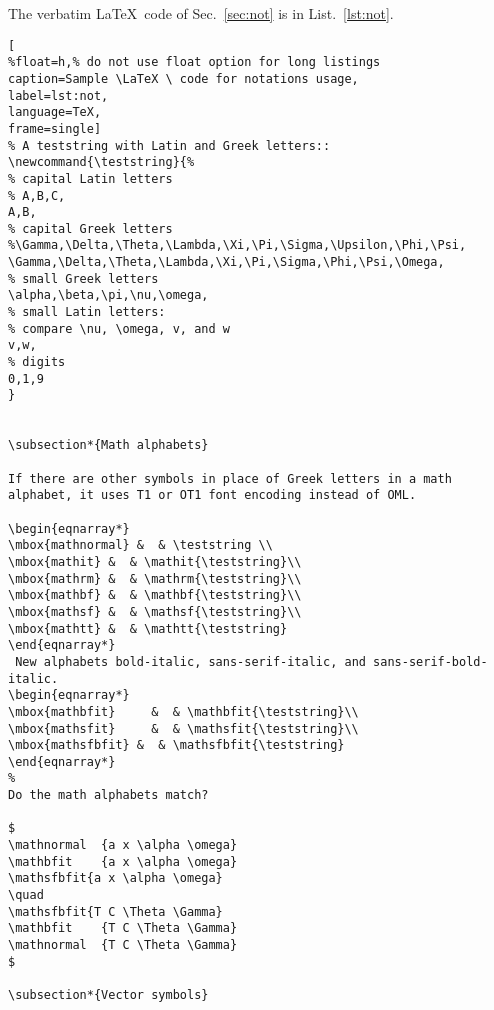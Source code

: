 \newpage
The verbatim \LaTeX \ code of Sec.~\ref{sec:not} is in List.~\ref{lst:not}.

\begin{lstlisting}[
%float=h,% do not use float option for long listings
caption=Sample \LaTeX \ code for notations usage, 
label=lst:not,
language=TeX,
frame=single]
% A teststring with Latin and Greek letters::
\newcommand{\teststring}{%
% capital Latin letters
% A,B,C,
A,B,
% capital Greek letters
%\Gamma,\Delta,\Theta,\Lambda,\Xi,\Pi,\Sigma,\Upsilon,\Phi,\Psi,
\Gamma,\Delta,\Theta,\Lambda,\Xi,\Pi,\Sigma,\Phi,\Psi,\Omega,
% small Greek letters
\alpha,\beta,\pi,\nu,\omega,
% small Latin letters:
% compare \nu, \omega, v, and w
v,w,
% digits
0,1,9
}


\subsection*{Math alphabets}

If there are other symbols in place of Greek letters in a math
alphabet, it uses T1 or OT1 font encoding instead of OML.

\begin{eqnarray*}
\mbox{mathnormal} &  & \teststring \\
\mbox{mathit} &  & \mathit{\teststring}\\
\mbox{mathrm} &  & \mathrm{\teststring}\\
\mbox{mathbf} &  & \mathbf{\teststring}\\
\mbox{mathsf} &  & \mathsf{\teststring}\\
\mbox{mathtt} &  & \mathtt{\teststring}
\end{eqnarray*}
 New alphabets bold-italic, sans-serif-italic, and sans-serif-bold-italic.
\begin{eqnarray*}
\mbox{mathbfit}     &  & \mathbfit{\teststring}\\
\mbox{mathsfit}     &  & \mathsfit{\teststring}\\
\mbox{mathsfbfit} &  & \mathsfbfit{\teststring}
\end{eqnarray*}
%
Do the math alphabets match?

$
\mathnormal  {a x \alpha \omega}
\mathbfit    {a x \alpha \omega}
\mathsfbfit{a x \alpha \omega}
\quad
\mathsfbfit{T C \Theta \Gamma}
\mathbfit    {T C \Theta \Gamma}
\mathnormal  {T C \Theta \Gamma}
$

\subsection*{Vector symbols}


\end{lstlisting}
